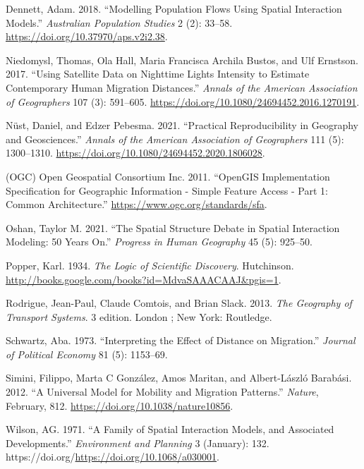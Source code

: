 \documentclass[11pt,letterpaper]{article}
\newlength{\cslhangindent}
\newlength{\cslentryspacingunit} %
\newenvironment{CSLReferences}[2] %
 {%
  \setlength{\parindent}{0pt}
  \ifodd #1
  \let\oldpar\par
  \def\par{\hangindent=\cslhangindent\oldpar}
  \fi
  \setlength{\parskip}{#2\cslentryspacingunit}
 }%
 {}
\begin{document}
\hypertarget{refs}{}
\begin{CSLReferences}{1}{0}
\leavevmode{}%
Dennett, Adam. 2018. {``Modelling Population Flows Using Spatial Interaction Models.''} \emph{Australian Population Studies} 2 (2): 33--58. \url{https://doi.org/10.37970/aps.v2i2.38}.

\leavevmode{}%
Niedomysl, Thomas, Ola Hall, Maria Francisca Archila Bustos, and Ulf Ernstson. 2017. {``Using Satellite Data on Nighttime Lights Intensity to Estimate Contemporary Human Migration Distances.''} \emph{Annals of the American Association of Geographers} 107 (3): 591--605. \url{https://doi.org/10.1080/24694452.2016.1270191}.

\leavevmode{}%
Nüst, Daniel, and Edzer Pebesma. 2021. {``Practical Reproducibility in Geography and Geosciences.''} \emph{Annals of the American Association of Geographers} 111 (5): 1300--1310. \url{https://doi.org/10.1080/24694452.2020.1806028}.

\leavevmode{}%
(OGC) Open Geospatial Consortium Inc. 2011. {``OpenGIS Implementation Specification for Geographic Information - Simple Feature Access - Part 1: Common Architecture.''} \url{https://www.ogc.org/standards/sfa}.

\leavevmode{}%
Oshan, Taylor M. 2021. {``The Spatial Structure Debate in Spatial Interaction Modeling: 50 Years On.''} \emph{Progress in Human Geography} 45 (5): 925--50.

\leavevmode{}%
Popper, Karl. 1934. \emph{The Logic of Scientific Discovery}. Hutchinson. \url{http://books.google.com/books?id=MdvaSAAACAAJ\&pgis=1}.

\leavevmode{}%
Rodrigue, Jean-Paul, Claude Comtois, and Brian Slack. 2013. \emph{The Geography of Transport Systems}. 3 edition. London ; New York: Routledge.

\leavevmode{}%
Schwartz, Aba. 1973. {``Interpreting the Effect of Distance on Migration.''} \emph{Journal of Political Economy} 81 (5): 1153--69.

\leavevmode{}%
Simini, Filippo, Marta C González, Amos Maritan, and Albert-László Barabási. 2012. {``A Universal Model for Mobility and Migration Patterns.''} \emph{Nature}, February, 812. \url{https://doi.org/10.1038/nature10856}.

\leavevmode{}%
Wilson, AG. 1971. {``A Family of Spatial Interaction Models, and Associated Developments.''} \emph{Environment and Planning} 3 (January): 132. https://doi.org/\url{https://doi.org/10.1068/a030001}.

\end{CSLReferences}




\setlength{\bibsep}{0.00cm plus 0.05cm} %


\end{document}
